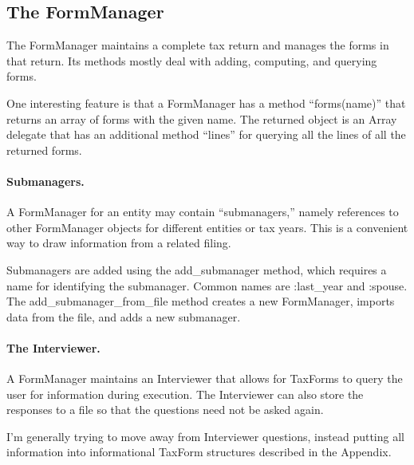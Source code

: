 \subsection{The FormManager}

The FormManager maintains a complete tax return and manages the forms in that
return. Its methods mostly deal with adding, computing, and querying forms.

One interesting feature is that a FormManager has a method ``forms(name)'' that
returns an array of forms with the given name. The returned object is an Array
delegate that has an additional method ``lines'' for querying all the lines of
all the returned forms.

\paragraph{Submanagers.}
A FormManager for an entity may contain ``submanagers,'' namely
references to other FormManager objects for different entities or tax years.
This is a convenient way to draw information from a related filing.

Submanagers are added using the add\_submanager method, which requires a name
for identifying the submanager. Common names are :last\_year and :spouse. The
add\_submanager\_from\_file method creates a new FormManager, imports data from
the file, and adds a new submanager.

\paragraph{The Interviewer.} A FormManager maintains an Interviewer that allows
for TaxForms to query the user for information during execution. The Interviewer
can also store the responses to a file so that the questions need not be asked
again.

I'm generally trying to move away from Interviewer questions, instead putting
all information into informational TaxForm structures described in the Appendix.



